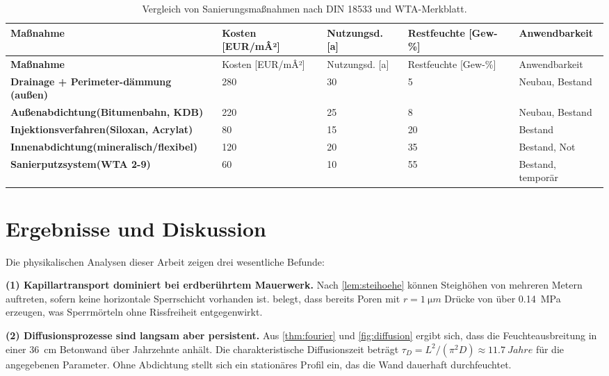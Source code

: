 ﻿\documentclass[a4paper,12pt]{article}
\theoremstyle{definition}
\begin{document}
\begin{longtable}{>{\bfseries}p{3.2cm}p{1.8cm}p{1.8cm}p{2.0cm}p{2.5cm}}
  \caption{Vergleich von Sanierungsma\ss{}nahmen nach DIN 18533 und WTA-Merkblatt.}
  \label{tab:massnahmen}\\
  \toprule
  Ma\ss{}nahme & Kosten [EUR/mÂ²] & Nutzungsd. [a] & Restfeuchte [Gew-\%] & Anwendbarkeit \\
  \midrule
  \endfirsthead
  \toprule
  Ma\ss{}nahme & Kosten [EUR/mÂ²] & Nutzungsd. [a] & Restfeuchte [Gew-\%] & Anwendbarkeit \\
  \midrule
  \endhead
  \bottomrule
  \endfoot
  Drainage + Perimeter-\newline d\"ammung (au\ss{}en) & 280 & 30 & 5 & Neubau, Bestand \\
  Au\ss{}enabdichtung\newline (Bitumenbahn, KDB) & 220 & 25 & 8 & Neubau, Bestand \\
  Injektionsverfahren\newline (Siloxan, Acrylat) & 80 & 15 & 20 & Bestand \\
  Innenabdichtung\newline (mineralisch/flexibel) & 120 & 20 & 35 & Bestand, Not \\
  Sanierputzsystem\newline (WTA 2-9) & 60 & 10 & 55 & Bestand, tempor\"ar \\
\end{longtable}

\section{Ergebnisse und Diskussion}
\label{sec:ergebnisse}

Die physikalischen Analysen dieser Arbeit zeigen drei wesentliche Befunde:

\textbf{(1) Kapillartransport dominiert bei erdber\"uhrtem Mauerwerk.}
Nach \cref{lem:steihoehe} k\"onnen Steigh\"ohen von mehreren Metern
auftreten, sofern keine horizontale Sperrschicht vorhanden ist.
 belegt, dass bereits Poren mit
$r = \SI{1}{\micro m}$ Dr\"ucke von \"uber \SI{0.14}{MPa} erzeugen,
was Sperrm\"orteln ohne Rissfreiheit entgegenwirkt.

\textbf{(2) Diffusionsprozesse sind langsam aber persistent.}
Aus \cref{thm:fourier} und \cref{fig:diffusion} ergibt sich,
dass die Feuchteausbreitung in einer \SI{36}{cm} Betonwand \"uber
Jahrzehnte anh\"alt. Die charakteristische Diffusionszeit betr\"agt
$\tau_D = L^2/(\pi^2 D) \approx \SI{11.7}{Jahre}$ f\"ur die angegebenen
Parameter. Ohne Abdichtung stellt sich ein station\"ares Profil ein,
das die Wand dauerhaft durchfeuchtet.
\end{document}
